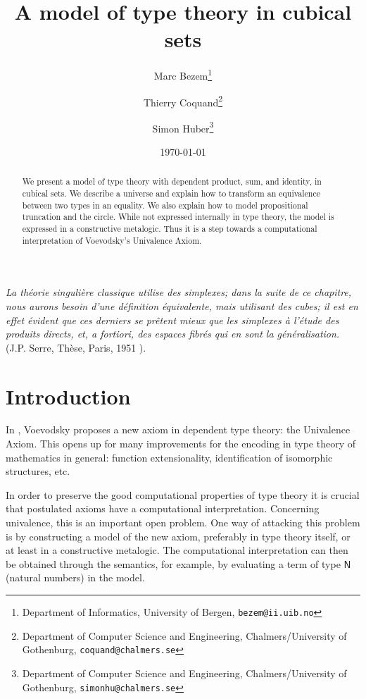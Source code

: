 \documentclass[10pt,a4paper]{article}
\newcommand{\nat}{\mathsf{N}}
\begin{document}
\title{A model of type theory in cubical sets}

\author{
Marc Bezem\thanks{Department of Informatics, University of Bergen, {\tt bezem@ii.uib.no}}
\and
Thierry Coquand\thanks{Department of Computer Science and Engineering, Chalmers/University of Gothenburg, {\tt coquand@chalmers.se}}
\and
Simon Huber\thanks{Department of Computer Science and Engineering, Chalmers/University of Gothenburg, {\tt simonhu@chalmers.se}}
}
\date{\today}
\maketitle


{\em La th\'eorie singuli\`ere classique utilise des {\em simplexes}; dans la suite de ce chapitre,
nous aurons besoin d'une d\'efinition
\'equivalente, mais utilisant des {\em cubes}; il est en effet \'evident que ces derniers se pr\^etent mieux que les
simplexes \`a l'\'etude des produits directs, et, a fortiori, des espaces fibr\'es qui en sont la g\'en\'eralisation.}
(J.P. Serre, Th\`ese, Paris, 1951 \cite{Serre}).


\begin{abstract}\noindent
  We present a model of type theory with dependent product, sum, and
  identity, in cubical sets.  We describe a universe and explain how
  to transform an equivalence between two types in an equality.  We
  also explain how to model propositional truncation and the circle.
  While not expressed internally in type theory, the model is
  expressed in a constructive metalogic.  Thus it is a step towards a
  computational interpretation of Voevodsky's Univalence Axiom.
\end{abstract}

\section*{Introduction}

In \cite{Voevodsky}, Voevodsky proposes a new axiom in dependent type
theory: the Univalence Axiom. This opens up for many improvements for
the encoding in type theory of mathematics in
general: function extensionality, identification of isomorphic
structures, etc.

In order to preserve the good computational properties of type theory
it is crucial that postulated axioms have a computational
interpretation.  Concerning univalence, this is an important open
problem.  One way of attacking this problem is by constructing a model
of the new axiom, preferably in type theory itself, or at least in a
constructive metalogic.  The computational interpretation can then be
obtained through the semantics, for example, by evaluating a term of
type $\nat$ (natural numbers) in the model.
\end{document}

